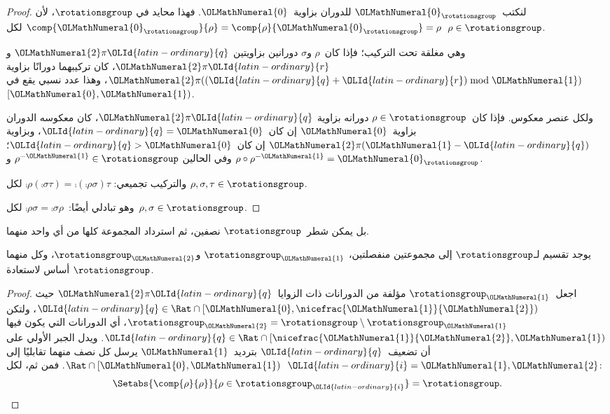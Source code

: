 \documentclass[../../../include/open-logic-section]{subfiles}
\begin{document}
\begin{proof}
لنكتب~${\OLMathNumeral{0}}_{\rotationsgroup}$ للدوران بزاوية~${\OLMathNumeral{0}}$. فهذا محايد في
$\rotationsgroup$، لأن
$\comp{{\OLMathNumeral{0}}_{\rotationsgroup}}{\rho} = \comp{\rho}{{\OLMathNumeral{0}}_{\rotationsgroup}} =
\rho$ لكل~$\rho \in \rotationsgroup$.

وهي مغلقة تحت التركيب؛ فإذا كان~$\rho$ و$\sigma$ دورانين بزاويتين
${\OLMathNumeral{2}}\pi {\OLId{latin-ordinary}{q}}$ و${\OLMathNumeral{2}}\pi {\OLId{latin-ordinary}{r}}$، كان تركيبهما دورانًا بزاوية
${\OLMathNumeral{2}}\pi(({\OLId{latin-ordinary}{q}}+{\OLId{latin-ordinary}{r}}) \bmod {\OLMathNumeral{1}})$، وهذا عدد نسبي يقع في~$[{\OLMathNumeral{0}},{\OLMathNumeral{1}})$.

ولكل عنصر معكوس. فإذا كان~$\rho \in \rotationsgroup$ دورانه بزاوية
${\OLMathNumeral{2}}\pi {\OLId{latin-ordinary}{q}}$، كان معكوسه الدوران بزاوية~${\OLMathNumeral{0}}$ إن كان~${\OLId{latin-ordinary}{q}}={\OLMathNumeral{0}}$، وبزاوية
${\OLMathNumeral{2}}\pi({\OLMathNumeral{1}}-{\OLId{latin-ordinary}{q}})$ إن كان~${\OLId{latin-ordinary}{q}}>{\OLMathNumeral{0}}$؛ وفي الحالين
$\rho^{-{\OLMathNumeral{1}}} \in \rotationsgroup$ و
$\rho \circ \rho^{-{\OLMathNumeral{1}}} = {\OLMathNumeral{0}}_\rotationsgroup$.

والتركيب تجميعي:
$\comp{\rho}{(\comp{\sigma}{\tau})} =
\comp{(\comp{\rho}{\sigma})}{\tau}$ لكل
$\rho, \sigma, \tau \in \rotationsgroup$.

وهو تبادلي أيضًا:~$\comp{\rho}{\sigma} =
\comp{\sigma}{\rho}$ لكل~$\rho, \sigma \in \rotationsgroup$.
\end{proof}

بل يمكن شطر~$\rotationsgroup$ نصفين، ثم استرداد المجموعة كلها من أي
واحد منهما.

\begin{lem}
يوجد تقسيم لـ$\rotationsgroup$ إلى مجموعتين منفصلتين،
$\rotationsgroup_{{\OLMathNumeral{1}}}$ و$\rotationsgroup_{{\OLMathNumeral{2}}}$، وكل منهما أساس لاستعادة
$\rotationsgroup$.
\end{lem}

\begin{proof}
اجعل~$\rotationsgroup_{{\OLMathNumeral{1}}}$ مؤلفة من الدورانات ذات الزوايا~${\OLMathNumeral{2}}\pi {\OLId{latin-ordinary}{q}}$ حيث
${\OLId{latin-ordinary}{q}} \in \Rat \cap [{\OLMathNumeral{0}},\nicefrac{{\OLMathNumeral{1}}}{{\OLMathNumeral{2}}})$، ولتكن
$\rotationsgroup_{{\OLMathNumeral{2}}} = \rotationsgroup \setminus
\rotationsgroup_{\OLMathNumeral{1}}$، أي الدورانات التي يكون فيها
${\OLId{latin-ordinary}{q}} \in \Rat \cap [\nicefrac{{\OLMathNumeral{1}}}{{\OLMathNumeral{2}}},{\OLMathNumeral{1}})$. ويدل الجبر الأولي على أن
تضعيف~${\OLId{latin-ordinary}{q}}$ بترديد~${\OLMathNumeral{1}}$ يرسل كل نصف منهما تقابليًا إلى
$\Rat \cap [{\OLMathNumeral{0}},{\OLMathNumeral{1}})$. فمن ثم، لكل~${\OLId{latin-ordinary}{i}}={\OLMathNumeral{1}},{\OLMathNumeral{2}}$:
\[
	\Setabs{\comp{\rho}{\rho}}{\rho \in \rotationsgroup_{\OLId{latin-ordinary}{i}}} =
	\rotationsgroup.
\]
\end{proof}
\end{document}
